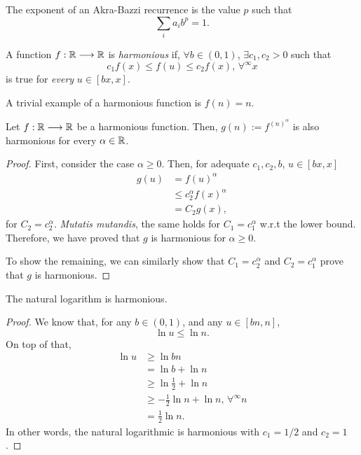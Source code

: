 The exponent of an Akra-Bazzi recurrence is the value $p$ such that \[
\sum_{i} a_i b^{p} = 1
.\] 

\begin{definition}
    A function $f: \mathbb{R} \longrightarrow \mathbb{R}$ is  \emph{harmonious} if, $\forall b\in (0,1)$, $\exists c_1,c_2 > 0$ such that \[
    c_1 f(x) \le f(u) \le c_2f(x),\,\forall^{\infty}x
    \] is true for \emph{every} $u\in [bx,x]$.
\end{definition}

A trivial example of a harmonious function is $f(n) = n$.

\begin{lemma}
    Let $f: \mathbb{R} \longrightarrow \mathbb{R}$ be a harmonious function.
    Then, $g(n) := f^(n)^{\alpha}$ is also harmonious for every $\alpha \in \mathbb{R}$.
\end{lemma}
\begin{proof}
    First, consider the case $\alpha\ge 0$.
    Then, for adequate $c_1,c_2,b$, $u\in [bx,x]$
    \begin{align*}
	g(u) &= f(u)^{\alpha} \\
	    &\le c_2^{\alpha} f(x)^{\alpha}  \\
	    &= C_2g(x)
    ,\end{align*}
    for $C_2=c_2^{\alpha}$. \emph{Mutatis mutandis}, the same holds for $C_1 = c_1^{\alpha}$ w.r.t the lower bound.
    Therefore, we have proved that $g$ is harmonious for $\alpha \ge 0$.

    To show the remaining, we can similarly show that $C_1=c_2^{\alpha}$ and $C_2=c_1^{\alpha}$ prove that $g$ is harmonious.
\end{proof}

\begin{lemma}
    The natural logarithm is harmonious.
\end{lemma}
\begin{proof}
    We know that, for any $b\in \left( 0,1 \right) $, and any $u\in [bn,n]$,  \[
    \ln u \le \ln n
    .\] On top of that,
    \begin{align*}
	\ln u &\ge \ln bn \\
	&= \ln b + \ln n \\
	&\ge  \ln \frac{1}{2} + \ln n \\
	&\ge -\frac{1}{2} \ln n + \ln n,\,\forall^{\infty} n \\
	&= \frac{1}{2} \ln n
    .\end{align*}
    In other words, the natural logarithmic is harmonious with $c_1 = 1 / 2$ and  $c_2=1$.
\end{proof}



